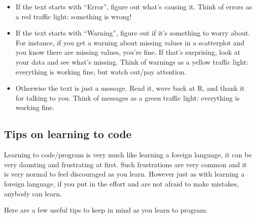 \documentclass[12pt, krantz2,]{krantz}
\providecommand{\tightlist}{%
  \setlength{\itemsep}{0pt}\setlength{\parskip}{0pt}}
\begin{document}
\begin{itemize}
\tightlist
\item
  If the text starts with ``Error'', figure out what's causing it. {Think of errors as a red traffic light: something is wrong!}
\item
  If the text starts with ``Warning'', figure out if it's something to worry about. For instance, if you get a warning about missing values in a scatterplot and you know there are missing values, you're fine. If that's surprising, look at your data and see what's missing. {Think of warnings as a yellow traffic light: everything is working fine, but watch out/pay attention.}
\item
  Otherwise the text is just a message. Read it, wave back at R, and thank it for talking to you. {Think of messages as a green traffic light: everything is working fine.}
\end{itemize}

\hypertarget{tips-on-learning-to-code}{%
\subsection{Tips on learning to code}\label{tips-on-learning-to-code}}

Learning to code/program is very much like learning a foreign language, it can be very daunting and frustrating at first. Such frustrations are very common and it is very normal to feel discouraged as you learn. However just as with learning a foreign language, if you put in the effort and are not afraid to make mistakes, anybody can learn.

Here are a few useful tips to keep in mind as you learn to program:
\end{document}
